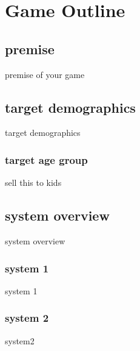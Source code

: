 \chapter{Game Outline}
\section{premise}
premise of your game\\
\newpage
\section{target demographics}
target demographics
\newpage
\subsection{target age group}
sell this to kids
\newpage
\section{system overview}
system overview
\subsection{system 1}
system 1
\newpage
\subsection{system 2}
system2